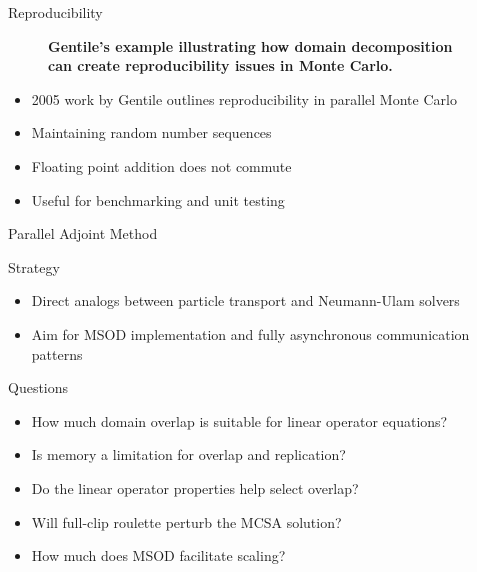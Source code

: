 \documentclass{beamer}
\begin{document}
\begin{frame}{Reproducibility}

  \begin{figure}[htpb!]
    \begin{center}
      \scalebox{0.7}{  }
    \end{center}
    \caption{\textbf{Gentile's example illustrating how domain
        decomposition can create reproducibility issues in Monte
        Carlo.}}
    \label{fig:gentile_example}
  \end{figure}

  \begin{itemize}
  \item 2005 work by Gentile outlines reproducibility in parallel
    Monte Carlo
  \item Maintaining random number sequences
  \item Floating point addition does not commute
  \item Useful for benchmarking and unit testing
  \end{itemize}

\end{frame}

\begin{frame}{Parallel Adjoint Method}

Strategy
  \begin{itemize}
  \item Direct analogs between particle transport and Neumann-Ulam
    solvers 
  \item Aim for MSOD implementation and fully asynchronous
    communication patterns
  \end{itemize}

Questions
  \begin{itemize}
  \item How much domain overlap is suitable for linear operator
    equations? 
  \item Is memory a limitation for overlap and replication?
  \item Do the linear operator properties help select overlap?
  \item Will full-clip roulette perturb the MCSA solution?
  \item How much does MSOD facilitate scaling?
  \end{itemize}

\end{frame}
\end{document}
